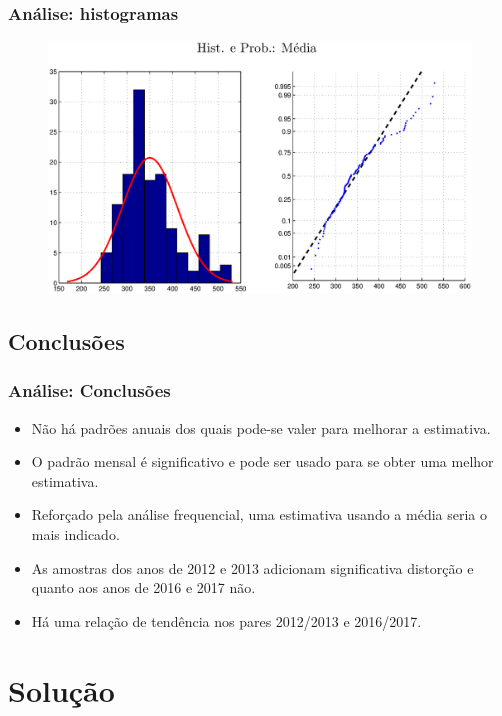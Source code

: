 \documentclass[xcolor=dvipsnames,xcolor=table]{beamer}
\begin{document}
\begin{frame}\frametitle{Análise: histogramas}
\begin{figure}[htpb] \begin{center} 
\includegraphics[width=0.9\columnwidth]{hist1}
\end{center}
\end{figure}
\end{frame}

\subsection{Conclusões}
\begin{frame}\frametitle{Análise: Conclusões}

\begin{itemize}
\item Não há padrões anuais dos quais pode-se valer para melhorar a estimativa.
\item O padrão mensal é significativo e pode ser usado para se obter uma melhor estimativa.
\item Reforçado pela análise frequencial, uma estimativa usando a média seria o mais indicado.
\item As amostras dos anos de 2012 e 2013 adicionam significativa distorção e quanto aos anos de 2016 e 2017 não.
\item Há uma relação de tendência nos pares 2012/2013 e 2016/2017.
\end{itemize}

\end{frame}

\section{Solução}
\end{document}
